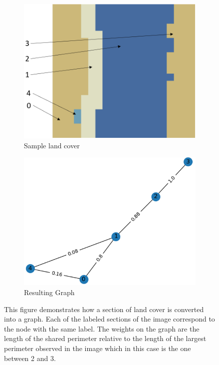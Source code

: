 \documentclass[journal,compsoc]{IEEEtran}
\begin{document}
\begin{figure}[t]
	\centering
	\begin{subfigure}[b]{.4\textwidth}
		\centering
		\includegraphics[width=\textwidth]{basic_landcover}
		\caption{Sample land cover}
		\label{Sample land cover}
	\end{subfigure}
	\vfill
	\begin{subfigure}[b]{.4\textwidth}
		\centering
		\includegraphics[width=\textwidth]{basic_landcover_graph}
		\caption{Resulting Graph}
		\label{Resulting Graph}
	\end{subfigure}
	\caption{This figure demonstrates how a section of land cover is converted into a graph. Each of the labeled sections of the image correspond to the node with the same label. The weights on the graph are the length of the shared perimeter relative to the length of the largest perimeter observed in the image which in this case is the one between 2 and 3.}
	\label{BasicTransform}
\end{figure}
\end{document}
